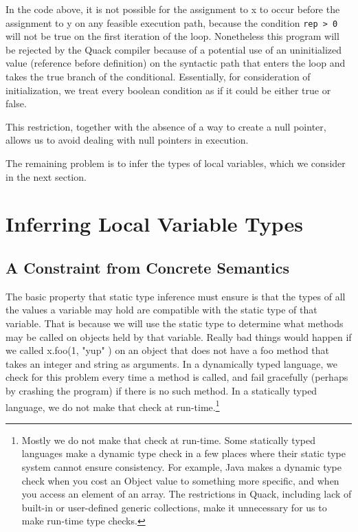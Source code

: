 \documentclass[11pt]{article}
\begin{document}
In the code above, it is not possible for the assignment to x to occur
before the assignment to y on any feasible execution path, because the
condition \verb|rep > 0| will not be true on the first iteration of
the loop.  Nonetheless this program will be rejected by the Quack
compiler because of a potential use of an uninitialized value
(reference before definition) on the syntactic path that enters the
loop and takes the true branch of the conditional.  Essentially, for
consideration of initialization, we treat every boolean condition as
if it could be either true or false. 

This restriction, together with the absence of a way to create a null
pointer, allows us to avoid dealing with null pointers in execution. 

The remaining problem is to infer the types of local variables, which
we consider in the next section. 

\section{Inferring Local Variable Types}

\subsection{A Constraint from Concrete Semantics}

The basic property that static type inference must ensure is that the
types of all the values a variable may hold are compatible with the
static type of that variable.  That is because we will use the static
type to determine what methods may be called on objects held by that
variable.  Really bad things would happen if we called x.foo(1, "yup" ) on
an object that does not have a foo method that takes an integer and
string as arguments.  In a dynamically typed language, we check for
this problem every time a method is called, and fail gracefully
(perhaps by crashing the program) if there is no such method.  In a
statically typed language, we do not make that check at
run-time.\footnote{Mostly we do not make that check at run-time.
  Some statically typed languages make a dynamic type check in a few
  places where their static type system cannot ensure consistency.
  For example, Java makes a dynamic type check when you cost an Object
  value to something more specific, and when you access an element of
  an array. The restrictions in Quack, including lack of built-in or
  user-defined generic collections, make it unnecessary for us to make
  run-time type checks.} 
\end{document}

